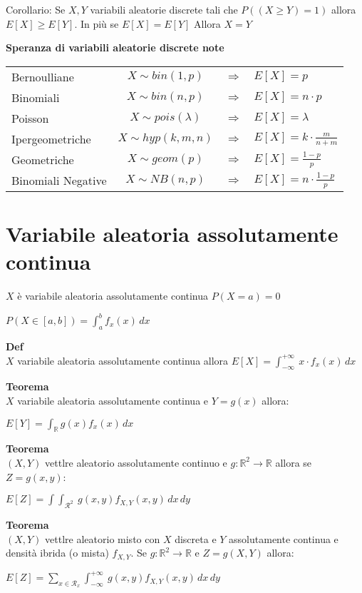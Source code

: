 \documentclass[11pt, letterpaper]{article}
\begin{document}
Corollario: Se $X,Y$ variabili aleatorie discrete tali che $P((X\geq Y)=1)$ allora $E[X]\geq E[Y]$. In più se $E[X]=E[Y]$ Allora
$X=Y$

\textbf{Speranza di variabili aleatorie discrete note}

\begin{tabular}{l c c l}
    Bernoulliane & $X\sim bin(1,p)$ & $\Rightarrow$ & $E[X]=p$\\
    Binomiali & $X\sim bin(n,p)$ & $\Rightarrow$ & $E[X]=n\cdot p$\\
    Poisson & $X\sim pois(\lambda)$ & $\Rightarrow$ & $E[X]=\lambda$\\
    Ipergeometriche & $X\sim hyp(k,m,n)$ & $\Rightarrow$ & $E[X]=k\cdot\frac{m}{n+m}$\\
    Geometriche & $X\sim geom(p)$ & $\Rightarrow$ & $E[X]=\frac{1-p}{p}$\\
    Binomiali Negative & $X\sim NB(n,p)$ & $\Rightarrow$ & $E[X]=n\cdot\frac{1-p}{p}$\\
\end{tabular}

\section{Variabile aleatoria assolutamente continua}
$X$ è variabile aleatoria assolutamente continua $P(X=a)=0$
\begin{center}
    $P(X\in[a,b])=\int_{a}^{b} f_{x}(x)\,dx $
\end{center}

\textbf{Def}\\ $X$ variabile aleatoria assolutamente continua allora $E[X]=\int_{-\infty}^{+\infty}\ x\cdot f_{x}(x) \,dx$

\newpage
\textbf{Teorema}\\$X$ variabile aleatoria assolutamente continua e $Y=g(x)$ allora:
\begin{center}
    $E[Y]=\int_{\mathbb{R}} g(x) f_{x}(x)\,dx$
\end{center}

\textbf{Teorema}\\$(X,Y)$ vettlre aleatorio assolutamente continuo e $g:\mathbb{R}^{2}\rightarrow\mathbb{R}$ allora se
$Z=g(x,y)$:
\begin{center}
    $E[Z]=\int\int_{\mathcal{R}^{2}}\ g(x,y)f_{X,Y}(x,y)\,dx\,dy$
\end{center}

\textbf{Teorema}\\$(X,Y)$ vettlre aleatorio misto con $X$ discreta e $Y$ assolutamente continua e densità ibrida (o mista)
$f_{X,Y}$. Se $g:\mathbb{R}^{2}\rightarrow\mathbb{R}$ e $Z=g(X,Y)$ allora:
\begin{center}
    $E[Z]=\sum_{x\in\mathcal{R}_{x}}\int_{-\infty}^{+\infty}\ g(x,y)f_{X,Y}(x,y)\,dx\,dy$
\end{center}
\end{document}
